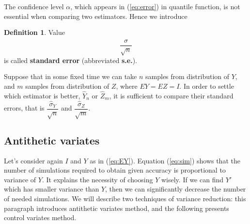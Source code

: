 \documentclass[a4paper,12pt, oneside]{book}
\theoremstyle{definition}
\newtheorem{mydef}{Definition}[chapter]
\theoremstyle{remark}
\begin{document}
The confidence level $\alpha$, which appears in (\ref{eq:error}) in quantile function, is not essential when comparing two estimators. Hence we introduce 
\begin{mydef}
 Value
 \begin{equation}
  \label{eq:stderr}
  \frac{\hat{\sigma}}{\sqrt{n}}
 \end{equation}
is called \textbf{standard error} (abbreviated \textbf{s.e.}).
\end{mydef}
Suppose that in some fixed time we can take $n$ samples from distribution of $Y$, and $m$ samples from distribution of $Z$, where $EY = EZ = I$. In order to settle which estimator is better, $\hat{Y}_n$ or $\hat{Z}_m$, it is sufficient to compare their standard errors, that is $\dfrac{\hat{\sigma}_Y}{\sqrt{n}}$ and $\dfrac{\hat{\sigma}_Z}{\sqrt{m}}$.

\subsection{Antithetic variates}
Let's consider again $I$ and $Y$ as in (\ref{eq:EY}). Equation (\ref{eq:sim}) shows that the number of simulations required to obtain given accuracy is proportional to variance of $Y$. It explains the necessity of choosing $Y$ wisely. If we can find $Y'$ which has smaller variance than $Y$, then we can significantly decrease the number of needed simulations.
We will describe two techniques of variance reduction: this paragraph introduces antithetic variates method, and the following presents control variates method.
\end{document}
